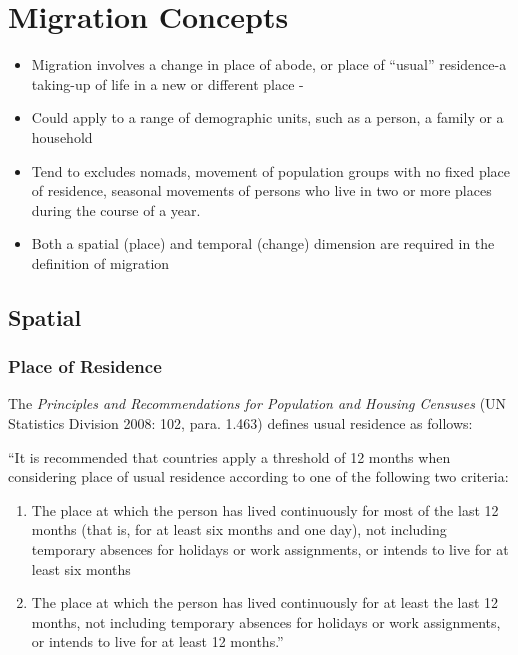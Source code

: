 \documentclass[
]{book}
\providecommand{\tightlist}{%
  \setlength{\itemsep}{0pt}\setlength{\parskip}{0pt}}
\begin{document}
\hypertarget{migration-concepts}{%
\chapter{Migration Concepts}\label{migration-concepts}}

\begin{itemize}
\tightlist
\item
  Migration involves a change in place of abode, or place of ``usual'' residence-a taking-up of life in a new or different place - \citet{UnitedNations1983}
\item
  Could apply to a range of demographic units, such as a person, a family or a household
\item
  Tend to excludes nomads, movement of population groups with no fixed place of residence, seasonal movements of persons who live in two or more places during the course of a year.
\item
  Both a spatial (place) and temporal (change) dimension are required in the definition of migration
\end{itemize}

\hypertarget{spatial}{%
\section{Spatial}\label{spatial}}

\hypertarget{place-of-residence}{%
\subsection{Place of Residence}\label{place-of-residence}}

The \emph{Principles and Recommendations for Population and Housing Censuses} (UN Statistics Division 2008: 102, para. 1.463) defines usual residence as follows:

``It is recommended that countries apply a threshold of 12 months when considering place of usual residence according to one of the following two criteria:

\begin{enumerate}
\def\labelenumi{\arabic{enumi}.}
\item
  The place at which the person has lived continuously for most of the last 12 months (that is, for at least six months and one day), not including temporary absences for holidays or work assignments, or intends to live for at least six months
\item
  The place at which the person has lived continuously for at least the last 12 months, not including temporary absences for holidays or work assignments, or intends to live for at least 12 months.''
\end{enumerate}
\end{document}
